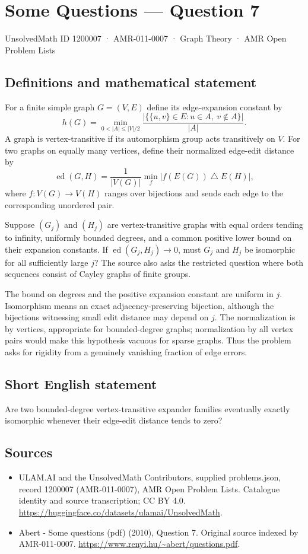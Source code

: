 \documentclass[11pt,a4paper]{article}
\begin{document}
\section*{Some Questions — Question 7}\label{1200007}
{\small UnsolvedMath ID 1200007 · AMR-011-0007 · Graph Theory · AMR Open Problem Lists}
\subsection{Definitions and mathematical statement}
For a finite simple graph $G=(V,E)$ define its edge-expansion constant by
\[
 h(G)=\min_{0<|A|\leq |V|/2}
       \frac{|\{\{u,v\}\in E:u\in A,\ v\notin A\}|}{|A|}.
\]
A graph is vertex-transitive if its automorphism group acts transitively on $V$. For two graphs on equally many vertices, define their normalized edge-edit distance by
\[
 \operatorname{ed}(G,H)=\frac1{|V(G)|}\min_f
                   |f(E(G))\mathbin{\triangle} E(H)|,
\]
where $f:V(G)\to V(H)$ ranges over bijections and sends each edge to the corresponding unordered pair.

Suppose $(G_j)$ and $(H_j)$ are vertex-transitive graphs with equal orders tending to infinity, uniformly bounded degrees, and a common positive lower bound on their expansion constants. If $\operatorname{ed}(G_j,H_j)\to0$, must $G_j$ and $H_j$ be isomorphic for all sufficiently large $j$? The source also asks the restricted question where both sequences consist of Cayley graphs of finite groups.

The bound on degrees and the positive expansion constant are uniform in $j$. Isomorphism means an exact adjacency-preserving bijection, although the bijections witnessing small edit distance may depend on $j$. The normalization is by vertices, appropriate for bounded-degree graphs; normalization by all vertex pairs would make this hypothesis vacuous for sparse graphs. Thus the problem asks for rigidity from a genuinely vanishing fraction of edge errors.
\subsection{Short English statement}
Are two bounded-degree vertex-transitive expander families eventually exactly isomorphic whenever their edge-edit distance tends to zero?
\subsection{Sources}
\begin{itemize}
\item[S1] ULAM.AI and the UnsolvedMath Contributors, supplied problems.json, record 1200007 (AMR-011-0007), AMR Open Problem Lists. Catalogue identity and source transcription; CC BY 4.0.
\url{https://huggingface.co/datasets/ulamai/UnsolvedMath}.
\item[S2] Abert - Some questions (pdf) (2010), Question 7. Original source indexed by AMR-011-0007.
\url{https://www.renyi.hu/~abert/questions.pdf}.
\end{itemize}
\end{document}
